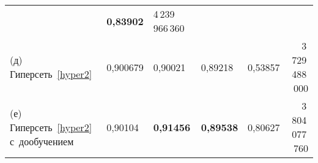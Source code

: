 \begin{multicols}{2}
\begin{table*}[b]
\begin{center}
\begin{tabular}{|l|l|l|l|l|r|}
& \bf{0,83902}                                                   & 4\,239\,966\,360\hspace*{5mm}                                                             
\\ %
 (д) Гиперсеть~\eqref{hyper2}               & \hspace*{1.2mm}0,900679                                                            
& 0,90021                                                          & 0,89218                                                           
& 0,53857                                                            & 3\,729\,488\,000\hspace*{5mm}                                                              \\ %
 (е) Гиперсеть~\eqref{hyper2} с~дообучением & \hspace*{1.2mm}0,90104                                                             
& \bf{0,91456}                                                 & \bf{0,89538}                                                  
& 0,80627                                                            & 3\,804\,077\,760\hspace*{5mm}                                                                 \\ 
\hline
\end{tabular}
\end{center}
\vspace*{-4pt}
%
\begin{center}
\label{t2}
\vspace*{2ex}


\end{center}
\end{table*}
\end{multicols}
